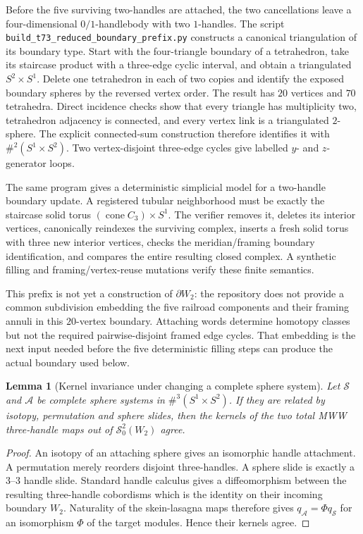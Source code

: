 \documentclass[11pt]{amsart}
\newtheorem{lemma}[theorem]{Lemma}
\theoremstyle{definition}
\theoremstyle{remark}
\begin{document}
Before the five surviving two-handles are attached, the two cancellations
leave a four-dimensional $0/1$-handlebody with two $1$-handles.  The script
\texttt{build\_t73\_reduced\_boundary\_prefix.py} constructs a canonical
triangulation of its boundary type.  Start with the four-triangle boundary of
a tetrahedron, take its staircase product with a three-edge cyclic interval,
and obtain a triangulated $S^2\times S^1$.  Delete one tetrahedron in each of
two copies and identify the exposed boundary spheres by the reversed vertex
order.  The result has $20$ vertices and $70$ tetrahedra.  Direct incidence
checks show that every triangle has multiplicity two, tetrahedron adjacency is
connected, and every vertex link is a triangulated $2$-sphere.  The explicit
connected-sum construction therefore identifies it with
\(\#^2(S^1\times S^2)\).  Two vertex-disjoint three-edge cycles give labelled
$y$- and $z$-generator loops.

The same program gives a deterministic simplicial model for a two-handle
boundary update.  A registered tubular neighborhood must be exactly the
staircase solid torus $(\operatorname{cone}C_3)\times S^1$.  The verifier
removes it, deletes its interior vertices, canonically reindexes the surviving
complex, inserts a fresh solid torus with three new interior vertices, checks
the meridian/framing boundary identification, and compares the entire resulting
closed complex.  A synthetic filling and framing/vertex-reuse mutations verify
these finite semantics.

This prefix is not yet a construction of $\partial W_2$: the repository does
not provide a common subdivision embedding the five railroad components and
their framing annuli in this $20$-vertex boundary.  Attaching words determine
homotopy classes but not the required pairwise-disjoint framed edge cycles.
That embedding is the next input needed before the five deterministic filling
steps can produce the actual boundary used below.

\begin{lemma}[Kernel invariance under changing a complete sphere system]
\label{lem:Ssystem}
Let \(\mathcal S\) and \(\mathcal A\) be complete sphere systems in
\(\#^3(S^1\times S^2)\).  If they are related by isotopy, permutation and
sphere slides, then the kernels of the two total MWW three-handle maps out of
\(\mathcal S^2_0(W_2)\) agree.
\end{lemma}

\begin{proof}
An isotopy of an attaching sphere gives an isomorphic handle attachment.
A permutation merely reorders disjoint three-handles.  A sphere slide is
exactly a \(3\)--\(3\) handle slide.  Standard handle calculus gives a
diffeomorphism between the resulting three-handle cobordisms which is the
identity on their incoming boundary \(W_2\).  Naturality of the skein-lasagna
maps therefore gives \(q_{\mathcal A}=\Phi q_{\mathcal S}\) for an
isomorphism \(\Phi\) of the target modules.  Hence their kernels agree.
\end{proof}
\end{document}
